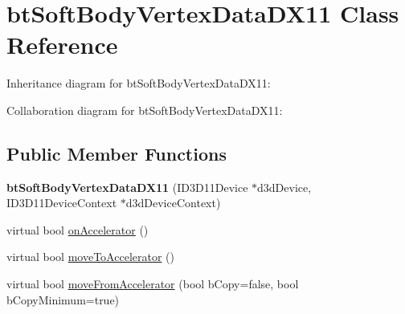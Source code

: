 \hypertarget{classbt_soft_body_vertex_data_d_x11}{\section{bt\+Soft\+Body\+Vertex\+Data\+D\+X11 Class Reference}
\label{classbt_soft_body_vertex_data_d_x11}
}


Inheritance diagram for bt\+Soft\+Body\+Vertex\+Data\+D\+X11\+:


Collaboration diagram for bt\+Soft\+Body\+Vertex\+Data\+D\+X11\+:
\subsection*{Public Member Functions}
\begin{DoxyCompactItemize}
\item 
\hypertarget{classbt_soft_body_vertex_data_d_x11_a67f758eb5b6c417171bd737e27d73d69}{{\bfseries bt\+Soft\+Body\+Vertex\+Data\+D\+X11} (I\+D3\+D11\+Device $\ast$d3d\+Device, I\+D3\+D11\+Device\+Context $\ast$d3d\+Device\+Context)}\label{classbt_soft_body_vertex_data_d_x11_a67f758eb5b6c417171bd737e27d73d69}

\item 
virtual bool \hyperlink{classbt_soft_body_vertex_data_d_x11_a735a87a0a4acc856b2f656bf684852e4}{on\+Accelerator} ()
\item 
virtual bool \hyperlink{classbt_soft_body_vertex_data_d_x11_ac12f0c144bc116e3a0e4c11fc0e55365}{move\+To\+Accelerator} ()
\item 
virtual bool \hyperlink{classbt_soft_body_vertex_data_d_x11_a32d4193d6e162e0a7a57975ebbab7a16}{move\+From\+Accelerator} (bool b\+Copy=false, bool b\+Copy\+Minimum=true)
\end{DoxyCompactItemize}
